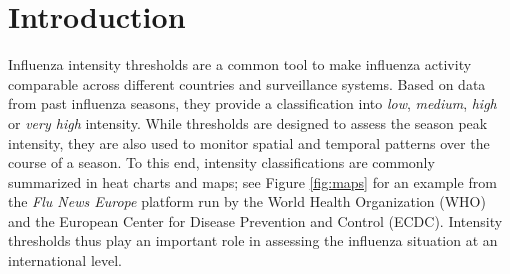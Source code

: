 \documentclass{article}
\begin{document}
\newpage

%




\section{Introduction}

Influenza intensity thresholds are a common tool to make influenza activity comparable across different countries and surveillance systems. Based on data from past influenza seasons, they provide a classification into \textit{low}, \textit{medium}, \textit{high} or \textit{very high} intensity. While thresholds are designed to assess the season peak intensity, they are also used to monitor spatial and temporal patterns over the course of a season. To this end, intensity classifications are commonly summarized in heat charts and maps; see Figure \ref{fig:maps} for an example from the \textit{Flu News Europe} platform run by the World Health Organization (WHO) and the European Center for Disease Prevention and Control (ECDC). Intensity thresholds thus play an important role in assessing the influenza situation at an international level.
\end{document}
